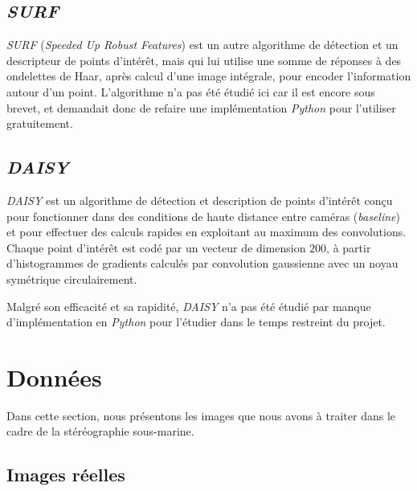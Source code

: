 \documentclass[
	a4paper, %
	10pt, %
	unnumberedsections, %
	twoside, %
]{LTJournalArticle}
\begin{document}

\subsection{\textit{SURF}}

\textit{SURF} \autocite{SURF} (\textit{Speeded Up Robust Features}) est un autre algorithme de détection
et un descripteur de points d'intérêt, mais qui lui utilise une somme de réponses à des ondelettes de Haar, après calcul d'une image intégrale, pour encoder l'information autour d'un point.
L'algorithme n'a pas été étudié ici car il est encore sous brevet, et demandait donc de refaire une implémentation \textit{Python} pour l'utiliser gratuitement.

\subsection{\textit{DAISY}}

\textit{DAISY} \autocite{DAISY} est un algorithme de détection et description de points d'intérêt conçu
pour fonctionner dans des conditions de haute distance entre caméras (\textit{baseline})
et pour effectuer des calculs rapides en exploitant au maximum des convolutions.
Chaque point d'intérêt est codé par un vecteur de dimension $200$, à partir d'histogrammes de gradients
calculés par convolution gaussienne avec un noyau symétrique circulairement.

Malgré son efficacité et sa rapidité, \textit{DAISY} n'a pas été étudié par manque d'implémentation en \textit{Python} pour l'étudier dans le temps restreint du projet.


\section{Données}

Dans cette section, nous présentons les images que nous avons à traiter dans le cadre de la stéréographie sous-marine.

\subsection{Images réelles}
\end{document}
